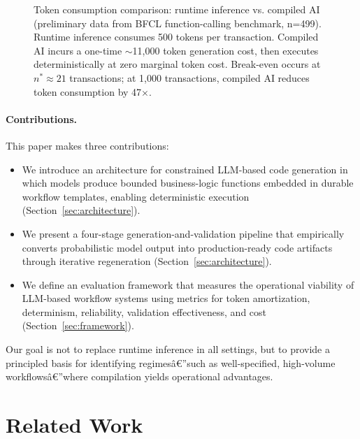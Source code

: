 \documentclass[11pt]{article}
\begin{document}
\begin{figure}[ht]
\begin{tikzpicture}[scale=0.9]
\end{tikzpicture}
\caption{Token consumption comparison: runtime inference vs. compiled AI (preliminary data from BFCL function-calling benchmark, n=499). Runtime inference consumes 500 tokens per transaction. Compiled AI incurs a one-time $\sim$11,000 token generation cost, then executes deterministically at zero marginal token cost. Break-even occurs at $n^*\approx21$ transactions; at 1,000 transactions, compiled AI reduces token consumption by 47$\times$.}
\label{fig:economics}
\end{figure}

\paragraph{Contributions.}
This paper makes three contributions:
\begin{itemize}
    \item We introduce an architecture for constrained LLM-based code generation in which models produce bounded business-logic functions embedded in durable workflow templates, enabling deterministic execution (Section~\ref{sec:architecture}).
    \item We present a four-stage generation-and-validation pipeline that empirically converts probabilistic model output into production-ready code artifacts through iterative regeneration (Section~\ref{sec:architecture}).
    \item We define an evaluation framework that measures the operational viability of LLM-based workflow systems using metrics for token amortization, determinism, reliability, validation effectiveness, and cost (Section~\ref{sec:framework}).
\end{itemize}

Our goal is not to replace runtime inference in all settings, but to provide a principled basis for identifying regimesâ€”such as well-specified, high-volume workflowsâ€”where compilation yields operational advantages.

\section{Related Work}
\label{sec:related-work}
\end{document}
